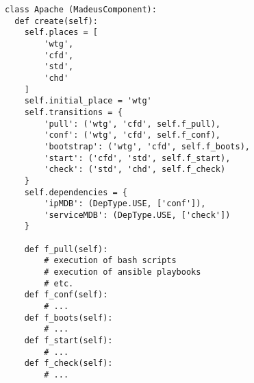 \begin{lstlisting}[label=codeapache,caption=Madeus code of the Apache
  component type.]
class Apache (MadeusComponent):
  def create(self):
    self.places = [
        'wtg',
        'cfd',
        'std',
        'chd'
    ]
    self.initial_place = 'wtg'
    self.transitions = {
        'pull': ('wtg', 'cfd', self.f_pull),
        'conf': ('wtg', 'cfd', self.f_conf),
        'bootstrap': ('wtg', 'cfd', self.f_boots),
        'start': ('cfd', 'std', self.f_start),
        'check': ('std', 'chd', self.f_check)
    }
    self.dependencies = {
        'ipMDB': (DepType.USE, ['conf']),
        'serviceMDB': (DepType.USE, ['check'])
    }

    def f_pull(self):
        # execution of bash scripts
        # execution of ansible playbooks
        # etc.
    def f_conf(self):
        # ...
    def f_boots(self):
        # ...
    def f_start(self):
        # ...
    def f_check(self):
        # ...
\end{lstlisting}

